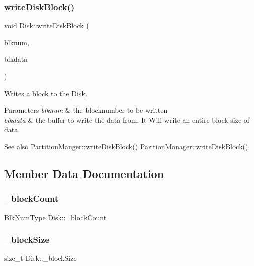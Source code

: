 \subsubsection{\texorpdfstring{write\+Disk\+Block()}{writeDiskBlock()}}
{\footnotesize\ttfamily void Disk\+::write\+Disk\+Block (\begin{DoxyParamCaption}\item[{Blk\+Num\+Type}]{blknum,  }\item[{char $\ast$}]{blkdata }\end{DoxyParamCaption})}

Writes a block to the \mbox{\hyperlink{class_disk}{Disk}}. 
\begin{DoxyParams}{Parameters}
{\em blknum} & the blocknumber to be written \\
\hline
{\em blkdata} & the buffer to write the data from. It Will write an entire block size of data. \\
\hline
\end{DoxyParams}
\begin{DoxySeeAlso}{See also}
Partition\+Manger\+::write\+Disk\+Block() Parition\+Manager\+::write\+Disk\+Block() 
\end{DoxySeeAlso}


\subsection{Member Data Documentation}
\mbox{\label{class_disk_a35a2900e2a8d3b567ef7280d3c475eac}} 
\subsubsection{\texorpdfstring{\+\_\+block\+Count}{\_blockCount}}
{\footnotesize\ttfamily Blk\+Num\+Type Disk\+::\+\_\+block\+Count\hspace{0.3cm}{\ttfamily [private]}}

\mbox{\label{class_disk_a3207de813954dad3e2547c7a892a04a7}} 
\subsubsection{\texorpdfstring{\+\_\+block\+Size}{\_blockSize}}
{\footnotesize\ttfamily size\+\_\+t Disk\+::\+\_\+block\+Size\hspace{0.3cm}{\ttfamily [private]}}

